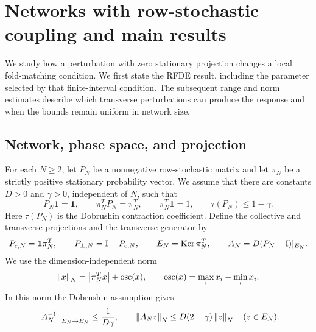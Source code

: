 \section{Networks with row-stochastic coupling and main results}
\label{sec:rw-model-results}
\label{sec:model-results}

We study how a perturbation with zero stationary projection changes a local
fold-matching condition.  We first state the RFDE result, including the
parameter selected by that finite-interval condition.  The subsequent range
and norm estimates describe which transverse perturbations can produce the
response and when the bounds remain uniform in network size.

\subsection{Network, phase space, and projection}

For each \(N\geq2\), let \(P_N\) be a nonnegative row-stochastic matrix and
let \(\pi_N\) be a strictly positive stationary probability vector.  We
assume that there are constants \(D>0\) and \(\gamma>0\), independent of
\(N\), such that
\begin{equation}
 P_N\mathbf1=\mathbf1,
 \qquad \pi_N^TP_N=\pi_N^T,
 \qquad \pi_N^T\mathbf1=1,
 \qquad \tau(P_N)\leq1-\gamma .
 \label{eq:rw-markov-assumptions}
\end{equation}
Here \(\tau(P_N)\) is the Dobrushin contraction coefficient.  Define the
collective and transverse projections and the transverse generator by
\begin{equation}
 P_{c,N}=\mathbf1\pi_N^T,
 \qquad P_{\perp,N}=\mathrm I-P_{c,N},
 \qquad E_N=\operatorname{Ker}\pi_N^T,
 \qquad A_N=D(P_N-\mathrm I)|_{E_N}.
 \label{eq:rw-collective-transverse}
\end{equation}
We use the dimension-independent norm
\begin{equation}
 \left\lVert x\right\rVert_N=\left\lvert\pi_N^Tx\right\rvert+\operatorname{osc}(x),
 \qquad
 \operatorname{osc}(x)=\max_i x_i-\min_i x_i.
 \label{eq:rw-network-norm}
\end{equation}
In this norm the Dobrushin assumption gives
\begin{equation}
 \left\lVert A_N^{-1}\right\rVert_{E_N\to E_N}\leq\frac1{D\gamma},
 \qquad
 \left\lVert A_Nz\right\rVert_N\leq D(2-\gamma)\left\lVert z\right\rVert_N
 \quad (z\in E_N).
 \label{eq:rw-dobrushin-resolvent}
\end{equation}

